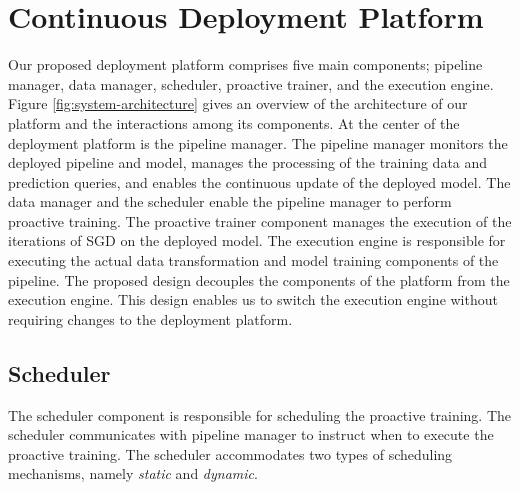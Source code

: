 \section{Continuous Deployment Platform} \label{sec:system-architecture}
Our proposed deployment platform comprises five main components; pipeline manager, data manager, scheduler, proactive trainer, and the execution engine.
Figure \ref{fig:system-architecture} gives an overview of the architecture of our platform and the interactions among its components.
At the center of the deployment platform is the pipeline manager.
The pipeline manager monitors the deployed pipeline and model, manages the processing of the training data and prediction queries, and enables the continuous update of the deployed model.
The data manager and the scheduler enable the pipeline manager to perform proactive training.
The proactive trainer component manages the execution of the iterations of SGD on the deployed model.
The execution engine is responsible for executing the actual data transformation and model training components of the pipeline.
The proposed design decouples the components of the platform from the execution engine.
This design enables us to switch the execution engine without requiring changes to the deployment platform.

\subsection{Scheduler}\label{scheduler}
The scheduler component is responsible for scheduling the proactive training.
The scheduler communicates with pipeline manager to instruct when to execute the proactive training.
The scheduler accommodates two types of scheduling mechanisms, namely \textit{static} and \textit{dynamic}.

